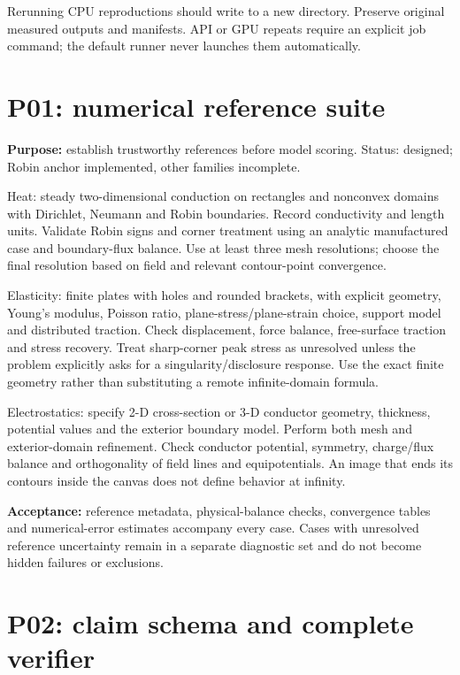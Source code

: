 \documentclass[
  11pt,
  a4paper,
]{article}
\begin{document}
Rerunning CPU reproductions should write to a new directory. Preserve
original measured outputs and manifests. API or GPU repeats require an
explicit job command; the default runner never launches them
automatically.

\section{P01: numerical reference
suite}\label{p01-numerical-reference-suite}

\textbf{Purpose:} establish trustworthy references before model scoring.
Status: designed; Robin anchor implemented, other families incomplete.

Heat: steady two-dimensional conduction on rectangles and nonconvex
domains with Dirichlet, Neumann and Robin boundaries. Record
conductivity and length units. Validate Robin signs and corner treatment
using an analytic manufactured case and boundary-flux balance. Use at
least three mesh resolutions; choose the final resolution based on field
and relevant contour-point convergence.

Elasticity: finite plates with holes and rounded brackets, with explicit
geometry, Young's modulus, Poisson ratio, plane-stress/plane-strain
choice, support model and distributed traction. Check displacement,
force balance, free-surface traction and stress recovery. Treat
sharp-corner peak stress as unresolved unless the problem explicitly
asks for a singularity/disclosure response. Use the exact finite
geometry rather than substituting a remote infinite-domain formula.

Electrostatics: specify 2-D cross-section or 3-D conductor geometry,
thickness, potential values and the exterior boundary model. Perform
both mesh and exterior-domain refinement. Check conductor potential,
symmetry, charge/flux balance and orthogonality of field lines and
equipotentials. An image that ends its contours inside the canvas does
not define behavior at infinity.

\textbf{Acceptance:} reference metadata, physical-balance checks,
convergence tables and numerical-error estimates accompany every case.
Cases with unresolved reference uncertainty remain in a separate
diagnostic set and do not become hidden failures or exclusions.

\section{P02: claim schema and complete
verifier}\label{p02-claim-schema-and-complete-verifier}
\end{document}
